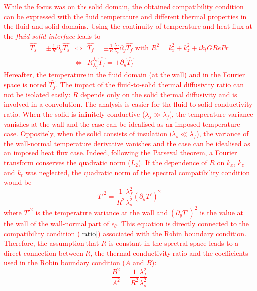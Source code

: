 \documentclass[review]{elsarticle}
\begin{document}
\textcolor{red}{While the focus was on the solid domain, the obtained compatibility condition can be expressed with the fluid temperature and different thermal properties in the fluid and solid domains.
Using the continuity of temperature and heat flux at the \textit{fluid-solid interface} leads to
\begin{eqnarray}
\widehat{T_s} = \pm \frac{1}{R} \partial_y \widehat{T_s} & \Longleftrightarrow  & \widehat{T_f} = \pm \frac{1}{R} \frac{\lambda_f}{\lambda_s} \partial_y \widehat{T_f} \mbox{ with } R^2=k_x^2 + k_z^2 + i k_t G Re Pr \nonumber \\
& \Longleftrightarrow  & R \frac{\lambda_s}{\lambda_f} \widehat{T_f} = \pm \partial_y \widehat{T_f}
\end{eqnarray}
Hereafter, the temperature in the fluid domain (at the wall) and in the Fourier space is noted $\widehat{T_f}$.
The impact of the fluid-to-solid thermal diffusivity ratio can not be isolated easily: $R$ depends only on the solid thermal diffusivity and is involved in a convolution.
The analysis is easier for the fluid-to-solid conductivity ratio.
When the solid is infinitely conductive ($\lambda_s \gg \lambda_f$), the temperature variance vanishes at the wall and the case can be idealised as an imposed temperature case.
Oppositely, when the solid consists of insulation ($\lambda_s \ll \lambda_f$), the variance of the wall-normal temperature derivative vanishes and the case can be idealised as an imposed heat flux case.
Indeed, following the Parseval theorem, a Fourier transform conserves the quadratic norm ($L_2$).
If the dependence of $R$ on $k_x$, $k_z$ and $k_t$ was neglected, the quadratic norm of the spectral compatibility condition would be
\begin{equation}
T'^2 = \frac{1}{R^2} \frac{\lambda_f^2}{\lambda_s^2} \left( \partial_y T' \right)^2
\end{equation}
where $T'^2$ is the temperature variance at the wall and $\left( \partial_y T' \right)^2$ is the value at the wall of the wall-normal part of $\epsilon_\theta$.
This equation is directly connected to the compatibility condition (\ref{ratio}) associated with the Robin boundary condition.
Therefore, the assumption that $R$ is constant in the spectral space leads to a direct connection between $R$, the thermal conductivity ratio and the coefficients used in the Robin boundary condition ($A$ and $B$):
\begin{equation}
\frac{B^2}{A^2} = \frac{1}{R^2} \frac{\lambda_f^2}{\lambda_s^2}
\end{equation}}
\end{document}
